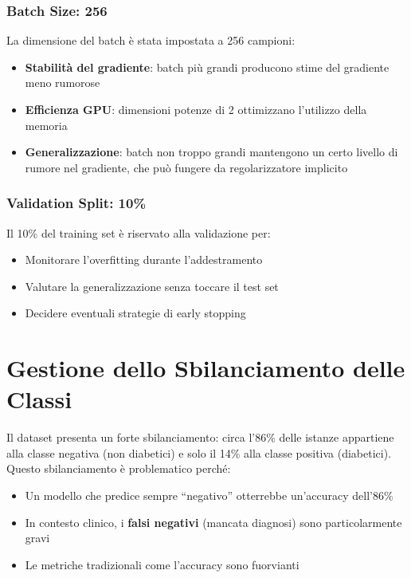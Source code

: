 \subsubsection{Batch Size: 256}

La dimensione del batch è stata impostata a 256 campioni:
\begin{itemize}
    \item \textbf{Stabilità del gradiente}: batch più grandi producono stime del gradiente meno rumorose
    \item \textbf{Efficienza GPU}: dimensioni potenze di 2 ottimizzano l'utilizzo della memoria
    \item \textbf{Generalizzazione}: batch non troppo grandi mantengono un certo livello di rumore nel gradiente, che può fungere da regolarizzatore implicito
\end{itemize}

\subsubsection{Validation Split: 10\%}

Il 10\% del training set è riservato alla validazione per:
\begin{itemize}
    \item Monitorare l'overfitting durante l'addestramento
    \item Valutare la generalizzazione senza toccare il test set
    \item Decidere eventuali strategie di early stopping
\end{itemize}

\section{Gestione dello Sbilanciamento delle Classi}

Il dataset presenta un forte sbilanciamento: circa l'86\% delle istanze appartiene alla classe negativa (non diabetici) e solo il 14\% alla classe positiva (diabetici). Questo sbilanciamento è problematico perché:

\begin{itemize}
    \item Un modello che predice sempre ``negativo'' otterrebbe un'accuracy dell'86\%
    \item In contesto clinico, i \textbf{falsi negativi} (mancata diagnosi) sono particolarmente gravi
    \item Le metriche tradizionali come l'accuracy sono fuorvianti
\end{itemize}

